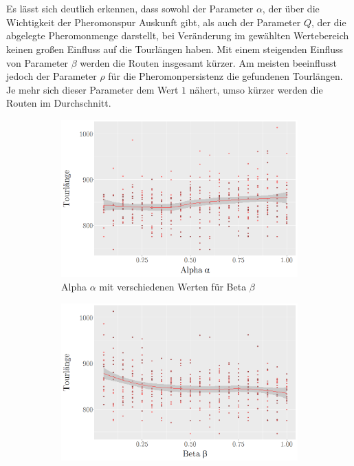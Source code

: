 \documentclass[doktyp=barbeit, sprache=german]{TUBAFarbeiten}
\begin{document}
\\\\Es lässt sich deutlich erkennen, dass sowohl der Parameter $\alpha$, der über die Wichtigkeit der Pheromonspur Auskunft gibt, als auch der Parameter $Q$, der die abgelegte Pheromonmenge darstellt, bei Veränderung im gewählten Wertebereich keinen großen Einfluss auf die Tourlängen haben. Mit einem steigenden Einfluss von Parameter $\beta$ werden die Routen insgesamt kürzer. Am meisten beeinflusst jedoch der Parameter $\rho$ für die Pheromonpersistenz die gefundenen Tourlängen. Je mehr sich dieser Parameter dem Wert $1$ nähert, umso kürzer werden die Routen im Durchschnitt.
\begin{figure}
        \centering
        \begin{subfigure}[b]{0.475\textwidth}
            \centering
            \includegraphics[width=\textwidth]{images/diagramiterativealpha}
            \caption{Alpha $\alpha$ mit verschiedenen Werten für Beta $\beta$}               
            \label{fig:iterativeAlpha}
        \end{subfigure}
        \hfill
        \begin{subfigure}[b]{0.475\textwidth}  
            \centering 
            \includegraphics[width=\textwidth]{images/diagramiterativebeta}

\end{subfigure}
\end{figure}
\end{document}
